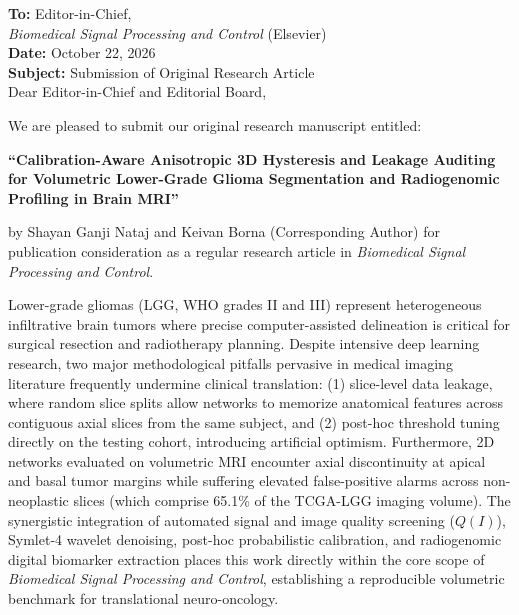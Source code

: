 \documentclass[11pt]{article}
\begin{document}
\thispagestyle{empty}

\noindent
\textbf{To:} Editor-in-Chief,\\
\textit{Biomedical Signal Processing and Control} (Elsevier)\\

\vspace{0.6em}
\noindent
\textbf{Date:} October 22, 2026\\
\textbf{Subject:} Submission of Original Research Article\\

\vspace{0.8em}
\noindent
Dear Editor-in-Chief and Editorial Board,

\vspace{0.6em}
We are pleased to submit our original research manuscript entitled:

\begin{center}
\textbf{``Calibration-Aware Anisotropic 3D Hysteresis and Leakage Auditing for Volumetric Lower-Grade Glioma Segmentation and Radiogenomic Profiling in Brain MRI''}
\end{center}

\noindent
by Shayan Ganji Nataj and Keivan Borna (Corresponding Author) for publication consideration as a regular research article in \textit{Biomedical Signal Processing and Control}.

\vspace{0.6em}
Lower-grade gliomas (LGG, WHO grades II and III) represent heterogeneous infiltrative brain tumors where precise computer-assisted delineation is critical for surgical resection and radiotherapy planning. Despite intensive deep learning research, two major methodological pitfalls pervasive in medical imaging literature frequently undermine clinical translation: (1) slice-level data leakage, where random slice splits allow networks to memorize anatomical features across contiguous axial slices from the same subject, and (2) post-hoc threshold tuning directly on the testing cohort, introducing artificial optimism. Furthermore, 2D networks evaluated on volumetric MRI encounter axial discontinuity at apical and basal tumor margins while suffering elevated false-positive alarms across non-neoplastic slices (which comprise 65.1\% of the TCGA-LGG imaging volume). The synergistic integration of automated signal and image quality screening ($Q(I)$), Symlet-4 wavelet denoising, post-hoc probabilistic calibration, and radiogenomic digital biomarker extraction places this work directly within the core scope of \textit{Biomedical Signal Processing and Control}, establishing a reproducible volumetric benchmark for translational neuro-oncology.
\end{document}
